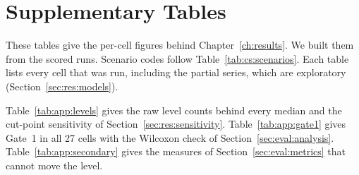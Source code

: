 \chapter{Supplementary Tables}
\label{app:supp}

These tables give the per-cell figures behind Chapter~\ref{ch:results}. We
built them from the scored runs.
Scenario codes follow Table~\ref{tab:cs:scenarios}. Each table lists every cell
that was run, including the partial series, which are exploratory
(Section~\ref{sec:res:models}).

Table~\ref{tab:app:levels} gives the raw level counts behind every median and
the cut-point sensitivity of Section~\ref{sec:res:sensitivity}.
Table~\ref{tab:app:gate1} gives Gate~1 in all 27 cells with the Wilcoxon check
of Section~\ref{sec:eval:analysis}. Table~\ref{tab:app:secondary} gives the
measures of Section~\ref{sec:eval:metrics} that cannot move the level.


